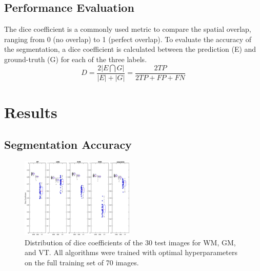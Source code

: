 \documentclass[journal]{IEEEtran}
\begin{document}
\subsection{Performance Evaluation}\label{ch.eval}
The dice coefficient is a commonly used metric to compare the spatial overlap, ranging from 0 (no overlap) to 1 (perfect overlap). To evaluate the accuracy of the segmentation, a dice coefficient is calculated between the prediction (E) and ground-truth (G) for each of the three labels. 
\begin{equation}
D = \frac{2|E \bigcap G|}{|E| + |G|} = \frac{2 TP}{2 TP + FP + FN}
\end{equation}
\vspace{1mm}
\section{Results}
\subsection{Segmentation Accuracy}
\begin{figure}
	\centering
	\includegraphics[width=0.48\textwidth]{images/boxplot}
	\caption{Distribution of dice coefficients of the 30 test images for WM, GM, and VT. All algorithms were trained with optimal hyperparameters on the full training set of 70 images.}\label{f.boxplot}
\end{figure}
\end{document}
